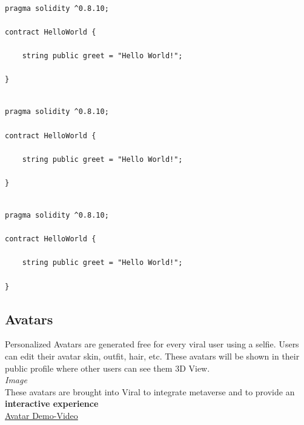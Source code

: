 \documentclass[10pt]{article}
\begin{document}
\begin{lstlisting}[language=Solidity,label={single-asset}, caption={NFT Snippet to sell single asset}, numbers=none]

pragma solidity ^0.8.10;

contract HelloWorld {

    string public greet = "Hello World!";
    
}
\end{lstlisting}

\begin{lstlisting}[language=Solidity, caption={NFT Snippet to provide extra information such as Name, Address, Mobile Number, before transferring coins with end to end encryption between seller}, numbers=none]

pragma solidity ^0.8.10;

contract HelloWorld {

    string public greet = "Hello World!";
    
}
\end{lstlisting}

\begin{lstlisting}[language=Solidity, caption={NFT Snippet to distribute shares Just like company share where if 100 NFTs is sold, the person who holds 50 NFT will hold 50\% of the company}, numbers=none]

pragma solidity ^0.8.10;

contract HelloWorld {

    string public greet = "Hello World!";
    
}
\end{lstlisting}

\pagebreak

\subsection{Avatars}

Personalized Avatars are generated free for every viral user using a selfie. Users can edit their avatar skin, outfit, hair, etc. These avatars will be shown in their public profile where other users can see them 3D View.\\

\textit{Image}\\

These avatars are brought into Viral to integrate metaverse and to provide an \textbf{interactive experience}\\

\hyperlink{https://sample.com}{Avatar Demo-Video}\\
\end{document}
